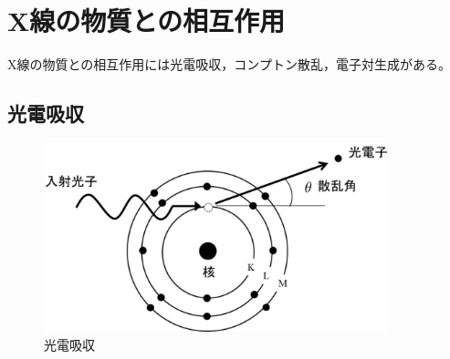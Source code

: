 \fi
%

\section{X線の物質との相互作用}
X線の物質との相互作用には光電吸収，コンプトン散乱，電子対生成がある。
\subsection{光電吸収}

\begin{figure}[H]
 \begin{center}
 \includegraphics[width=10cm]{image/other/photo_ab.eps}
 \end{center}
 \caption{光電吸収}
 \label{fig:photo_ab}
\end{figure}

